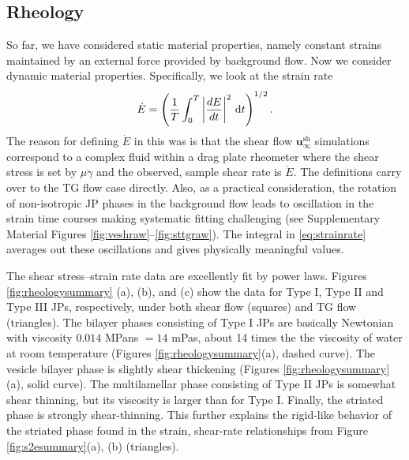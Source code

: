\documentclass[prb,preprint,showpacs,preprintnumbers,amsmath,amssymb,longbibliography]{revtex4-1}
\newcommand{\uu}{\mathbf{u}}
\begin{document}
\subsection{Rheology}
So far, we have considered static material properties, namely
constant strains maintained by an external force provided by   
background flow. Now we consider dynamic material properties.
Specifically, we look at the strain rate 
\begin{equation}
\label{eq:strainrate}
\dot E = \left(\frac{1}{T} \int_0^T \left|\frac{dE}{dt}\right|^2 \, \dif t \right)^{1/2}.
\end{equation}
The reason for defining $\dot E$ in this was is that 
the shear flow $\uu_{\infty}^{\text{sh}}$
simulations correspond to a complex fluid within a drag plate
rheometer where the shear stress is set by $\mu \dot\gamma$  
and the observed, sample shear rate is $\dot E$. 
The definitions carry over to the TG flow case directly. 
Also, as a practical consideration,
the rotation of non-isotropic JP phases in the background 
flow leads to oscillation in the strain time courses 
making systematic fitting challenging (see 
Supplementary Material Figures \ref{fig:veshraw}--\ref{fig:sttgraw}). 
The integral in \eqref{eq:strainrate} averages out these oscillations
and gives physically meaningful values.

The shear stress--strain rate data are 
excellently fit by power laws.  
Figures \ref{fig:rheologysummary} (a), (b), and (c)
show the data for Type I, Type II and Type III JPs, respectively,
under both shear flow (squares) and TG flow (triangles).
The bilayer phases consisting of Type I JPs are basically Newtonian
with viscosity $0.014$ MPa\;ns $= 14$ mPa\;s,
about 14 times the the viscosity of water at room temperature
(Figures \ref{fig:rheologysummary}(a), dashed curve). 
The vesicle bilayer phase is slightly shear thickening
(Figures \ref{fig:rheologysummary}(a), solid curve).
The multilamellar phase consisting of Type II JPs
is somewhat shear thinning,  but its viscosity 
is larger than for Type I.  Finally, the striated
phase is strongly shear-thinning.  This 
further explains the rigid-like behavior of the 
striated phase found in the strain, shear-rate relationships from 
Figure \ref{fig:s2esummary}(a), (b) (triangles).
 
\end{document}
